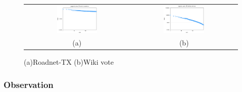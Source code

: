 \begin{figure}[h]
\begin{center}
\begin{tabular}{cc}
     \includegraphics[width=0.4\textwidth]{FIG/t2_tx.png} &
     \includegraphics[width=0.4\textwidth]{FIG/t2_wikivote.png} \\
    (a) & (b) 
\end{tabular}
\caption{(a)Roadnet-TX (b)Wiki vote}
\label{t2:5}
\end{center}
\end{figure}


\subsubsection{Observation}






